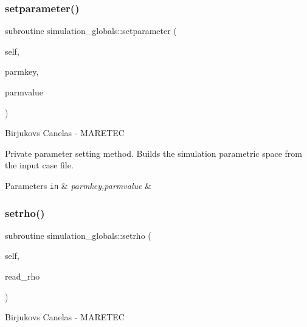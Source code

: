 \subsubsection{\texorpdfstring{setparameter()}{setparameter()}}
{\footnotesize\ttfamily subroutine simulation\+\_\+globals\+::setparameter (\begin{DoxyParamCaption}\item[{class(\mbox{\hyperlink{structsimulation__globals_1_1parameters__t}{parameters\+\_\+t}}), intent(inout)}]{self,  }\item[{type(string), intent(in)}]{parmkey,  }\item[{type(string), intent(in)}]{parmvalue }\end{DoxyParamCaption})\hspace{0.3cm}{\ttfamily [private]}}



Birjukovs Canelas -\/ M\+A\+R\+E\+T\+EC 

Private parameter setting method. Builds the simulation parametric space from the input case file. 
\begin{DoxyParams}[1]{Parameters}
\mbox{\tt in}  & {\em parmkey,parmvalue} & \\
\hline
\end{DoxyParams}
\mbox{\label{namespacesimulation__globals_acfdc640757f0275bccb1d8de7bd7dc92}} 
\subsubsection{\texorpdfstring{setrho()}{setrho()}}
{\footnotesize\ttfamily subroutine simulation\+\_\+globals\+::setrho (\begin{DoxyParamCaption}\item[{class(\mbox{\hyperlink{structsimulation__globals_1_1constants__t}{constants\+\_\+t}}), intent(inout)}]{self,  }\item[{type(string), intent(in)}]{read\+\_\+rho }\end{DoxyParamCaption})\hspace{0.3cm}{\ttfamily [private]}}



Birjukovs Canelas -\/ M\+A\+R\+E\+T\+EC 

